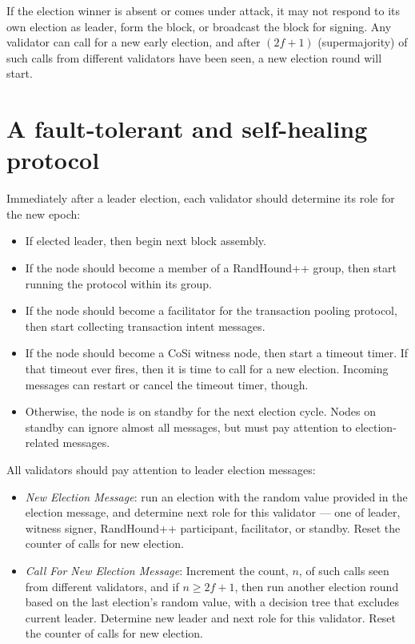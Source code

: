 \documentclass[8pt,fleqn,openany]{book}
\begin{document}
If the election winner is absent or comes under attack, it may not respond to its own election as leader, form the block, or broadcast the block for signing. Any validator can call for a new early election, and after $(2 f+1)$ (supermajority) of such calls from different validators have been seen, a new election round will start.

\section{A fault-tolerant and self-healing protocol} 
Immediately after a leader election, each validator should determine its role for the new epoch:

\begin{itemize}
  \item If elected leader, then begin next block assembly. 
  \item If the node should become a member of a RandHound++ group, then start running the protocol within its group.
  \item If the node should become a facilitator for the transaction pooling protocol, then start collecting transaction intent messages.
  \item If the node should become a CoSi witness node, then start a timeout timer. If that timeout ever fires, then it is time to call for a new election. Incoming messages can restart or cancel the timeout timer, though.
  \item Otherwise, the node is on standby for the next election cycle. Nodes on standby can ignore almost all messages, but must pay attention to election-related messages.
\end{itemize}  

All validators should pay attention to leader election messages:

\begin{itemize}
  \item{\textit{New Election Message}: run an election with the random value provided in the election message, and determine next role for this validator --- one of leader, witness signer, RandHound++ participant, facilitator, or standby. Reset the counter of calls for new election.}
  \item{\textit{Call For New Election Message}: Increment the count, $n$, of such calls seen from different validators, and if $n \ge 2 f +1$, then run another election round based on the last election's random value, with a decision tree that excludes current leader. Determine new leader and next role for this validator. Reset the counter of calls for new election.}
\end{itemize}
\end{document}
